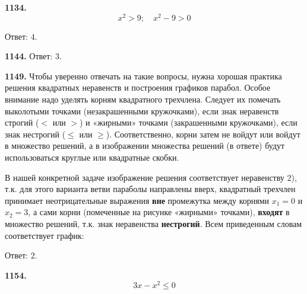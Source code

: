 \newpage \textbf{1134.} $$x^2>9;\quad x^2-9>0$$      

\begin{figure}[h!]
\end{figure}

\null \hspace*{\fill} Ответ: $4$.  

\textbf{1144.} \newline \null \hspace*{\fill} Ответ: $3$. 

\textbf{1149.} Чтобы уверенно отвечать на такие вопросы, нужна хорошая практика решения квадратных неравенств и построения графиков парабол. Особое внимание надо уделять корням квадратного трехчлена. Следует их помечать выколотыми точками (незакрашенными кружочками),  если знак неравенств строгий ($<$ или $>$) и «жирными» точками (закрашенными кружочками), если знак нестрогий ($\leq$ или $\geq$). Соответственно, корни затем не войдут или войдут в множество решений, а в изображении множества решений (в ответе) будут использоваться круглые  или квадратные скобки.

В нашей конкретной задаче изображение решения соответствует неравенству 2), т.к. для этого варианта  ветви параболы направлены вверх, квадратный трехчлен принимает неотрицательные выражения \textbf{вне} промежутка между корнями $x_1=0$ и $x_2=3$, а сами корни (помеченные на рисунке «жирными» точками), \textbf{входят} в множество решений, т.к. знак неравенства \textbf{нестрогий}. Всем приведенным словам соответствует график:

\begin{figure}[h!]
\end{figure}

\null \hspace*{\fill} Ответ: $2$.

\newpage \textbf{1154.} $$3x-x^2\leq0$$

\begin{figure}[h!]
\end{figure}

